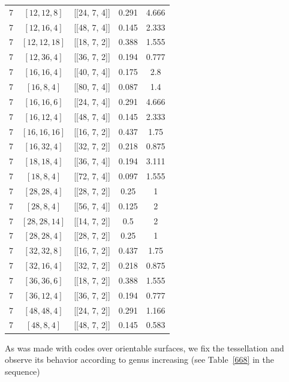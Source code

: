 \documentclass[%
reprint,
amsmath,amssymb,
aps,
]{revtex4-2}
\begin{document}
\begin{table}[b]
\begin{ruledtabular}
\begin{tabular}{|c|c|c|c|c|}
	7 & $[12, 12, 8]$ & [[24,	7,	4]] &	0.291 &	4.666  \\
	7 & $[12, 16, 4]$ & [[48,	7,	4]] & 	0.145 &	2.333   \\
	7 &	$[12, 12, 18]$ & [[18, 7,	2]] &	0.388 &	1.555   \\
	7 & $[12, 36, 4]$ & [[36,	7,	2]] &	0.194 &	0.777  \\
	7 & $[16, 16, 4]$ & [[40,	7,	4]] & 	0.175 &	2.8  \\
	7 &	$[16, 8, 4]$ & [[80,	7,	4]] &	0.087 &	1.4   \\
	7 & $[16, 16, 6]$ & [[24,	7, 	4]] &	0.291 &	4.666  \\
	7 &	$[16, 12, 4]$ & [[48,	7,	4]] &	0.145 &	2.333  \\
	7 & $[16, 16, 16]$ & [[16, 7,	2]] &	0.437 &	1.75  \\ 
	7 & $[16, 32, 4]$ & [[32,	7,	2]] &	0.218 &	0.875   \\
	7 & $[18, 18, 4]$ & [[36,	7,	4]] &	0.194 &	3.111  \\
	7 & $[18, 8, 4]$ & [[72,	7,	4]] &	0.097 &	1.555 \\
	7 & $[28, 28, 4]$ & [[28,	7,	2]] &	0.25 &	1  \\
	7 & $[28, 8, 4]$ & [[56,	7,	4]] &	0.125 &	2   \\
	7 & $[28, 28, 14]$ & [[14, 7,	2]] &	0.5 &	2   \\
	7 & $[28, 28, 4]$ & [[28,	7,	2]] &	0.25 &	1  \\
	7 & $[32, 32, 8]$ & [[16,	7,	2]] &	0.437 &	1.75  \\
	7 & $[32, 16, 4]$ & [[32,	7,	2]] &	0.218 &	0.875  \\
	7 & $[36, 36, 6]$ & [[18,	7,	2]] &	0.388 &	1.555  \\
	7 & $[36, 12, 4]$ & [[36,	7,	2]] &	0.194 &	0.777   \\
	7 & $[48, 48, 4]$ & [[24,	7,	2]] &	0.291 &	1.166  \\
	7 & $[48, 8, 4]$ & [[48,	7,	2]] &	0.145 &	0.583   
					\end{tabular}
\end{ruledtabular}
\end{table}

As was made with codes over orientable surfaces, we fix the tessellation and observe its behavior according to genus increasing (see Table~\ref{668} in the sequence)
\end{document}
